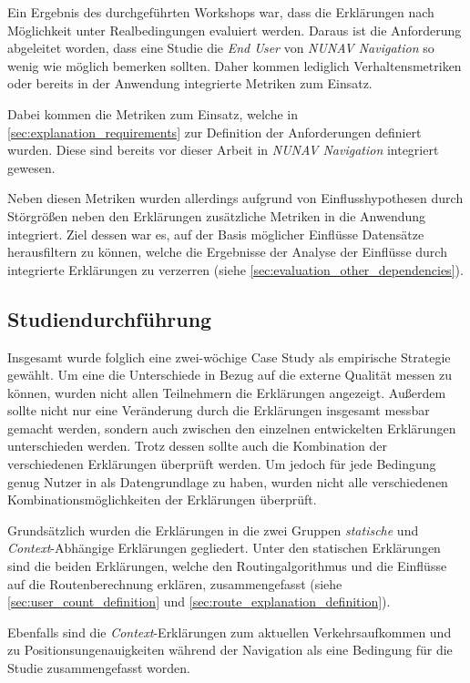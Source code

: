 Ein Ergebnis des durchgeführten Workshops war, dass die Erklärungen nach Möglichkeit unter Realbedingungen evaluiert werden. Daraus ist die Anforderung abgeleitet worden, dass eine Studie die \textit{End User} von \textit{NUNAV Navigation} so wenig wie möglich bemerken sollten. Daher kommen lediglich Verhaltensmetriken oder bereits in der Anwendung integrierte Metriken zum Einsatz.

Dabei kommen die Metriken zum Einsatz, welche in \autoref{sec:explanation_requirements} zur Definition der Anforderungen definiert wurden. Diese sind bereits vor dieser Arbeit in \textit{NUNAV Navigation} integriert gewesen.

Neben diesen Metriken wurden allerdings aufgrund von Einflusshypothesen durch Störgrößen neben den Erklärungen zusätzliche Metriken in die Anwendung integriert. Ziel dessen war es, auf der Basis möglicher Einflüsse Datensätze herausfiltern zu können, welche die Ergebnisse der Analyse der Einflüsse durch integrierte Erklärungen zu verzerren (siehe \autoref{sec:evaluation_other_dependencies}).

\subsection{Studiendurchführung}

Insgesamt wurde folglich eine zwei-wöchige Case Study als empirische Strategie gewählt. Um eine die Unterschiede in Bezug auf die externe Qualität messen zu können, wurden nicht allen Teilnehmern die Erklärungen angezeigt. Außerdem sollte nicht nur eine Veränderung durch die Erklärungen insgesamt messbar gemacht werden, sondern auch zwischen den einzelnen entwickelten Erklärungen unterschieden werden. Trotz dessen sollte auch die Kombination der verschiedenen Erklärungen überprüft werden. Um jedoch für jede Bedingung genug Nutzer in als Datengrundlage zu haben, wurden nicht alle verschiedenen Kombinationsmöglichkeiten der Erklärungen überprüft.

Grundsätzlich wurden die Erklärungen in die zwei Gruppen \textit{statische} und \textit{Context}-Abhängige Erklärungen gegliedert. Unter den statischen Erklärungen sind die beiden Erklärungen, welche den Routingalgorithmus und die Einflüsse auf die Routenberechnung erklären, zusammengefasst (siehe \autoref{sec:user_count_definition} und \autoref{sec:route_explanation_definition}).

Ebenfalls sind die \textit{Context}-Erklärungen zum aktuellen Verkehrsaufkommen und zu Positionsungenauigkeiten während der Navigation als eine Bedingung für die Studie zusammengefasst worden.

